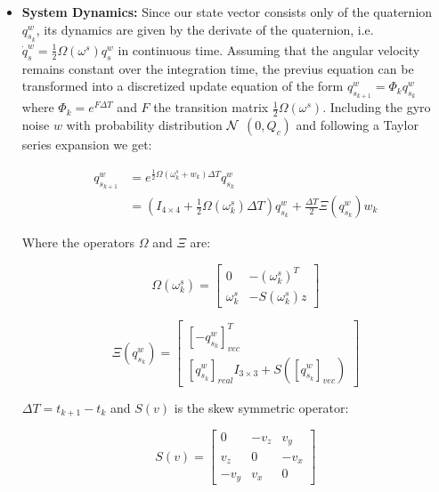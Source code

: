 \documentclass[a4paper,10pt]{article}
\begin{document}
\begin{itemize}
\item \textbf{System Dynamics:} Since our state vector consists only of the quaternion $q^w_{s_k}$, its dynamics are given by the derivate of the quaternion, i.e. $\dot{q}^w_s = \frac{1}{2}\Omega(\omega^s)q^w_s$ in continuous time. Assuming that the angular velocity remains constant over the integration time, the previus equation can be transformed into a discretized update equation of the form $q^w_{s_{k+1}} = \Phi_k q^w_{s_k}$ where $\Phi_k = e^{F\Delta T}$ and $F$ the transition matrix $\frac{1}{2}\Omega(\omega^s)$. Including the gyro noise $w$ with probability distribution $\cal{N}$ $(0,Q_c)$ and following a Taylor series expansion we get:

\begin{align}
 q^w_{s_{k+1}} &= e^{\frac{1}{2}\Omega(\omega^s_k + w_k)\Delta T} q^w_{s_k} \\
         &= (I_{4\times 4} + \frac{1}{2}\Omega(\omega^s_k)\Delta T)q^w_{s_k} + \frac{\Delta T}{2}\Xi(q^w_{s_k})w_k
\end{align}

Where the operators $\Omega$ and $\Xi$ are:

\begin{equation}
 \Omega(\omega^s_k) = \left[\begin{matrix}
                      0	        &  -(\omega^s_k)^T\\
                   \omega^s_k   &  -S(\omega^s_k)
z                  \end{matrix}\right]
\end{equation}

\begin{equation} 
 \Xi(q^w_{s_k}) = \left[\begin{matrix}
                   [-q^w_{s_k}]^T_{vec} \\
                    [q^w_{s_k}]_{real} I_{3\times3} + S([q^w_{s_k}]_{vec})
                  \end{matrix}\right]
\end{equation}

$\Delta T = t_{k+1} - t_k$ and $S(v)$ is the skew symmetric operator:

\begin{equation}
 S(v) = \left[\begin{matrix}
               0    &  -v_z  &   v_y\\
               v_z  &   0    &  -v_x\\
              -v_y  &   v_x  &    0 
              \end{matrix}\right]
\end{equation}




\end{itemize}
\end{document}
